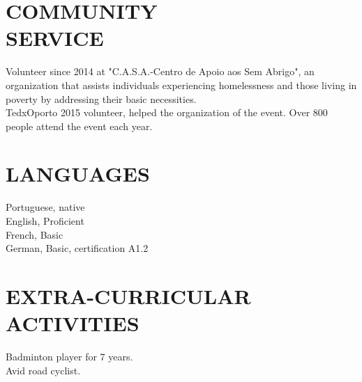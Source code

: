 \documentclass[margin, 10pt]{res} %
\begin{document}
\begin{resume}
    \section{COMMUNITY \\ SERVICE}

    Volunteer since 2014 at "C.A.S.A.-Centro de Apoio aos Sem Abrigo", an organization that assists individuals experiencing homelessness and those living in poverty by addressing their basic necessities.\\
    TedxOporto 2015 volunteer, helped the organization of the event. Over 800 people attend the event each year.

    \section{LANGUAGES}
    Portuguese, native\\
    English, Proficient\\
    French, Basic\\
    German, Basic, certification A1.2


    \section{EXTRA-CURRICULAR \\ ACTIVITIES}
    Badminton player for 7 years.\\
    Avid road cyclist.


\end{resume}
\end{document}
